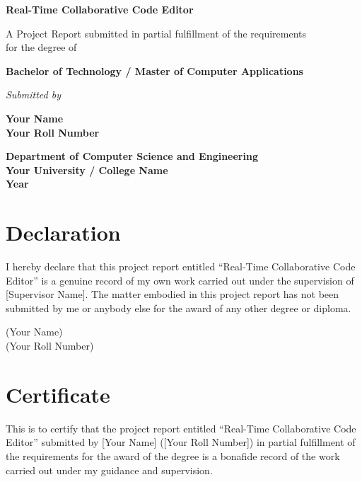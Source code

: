 \documentclass[12pt,a4paper]{report}
\begin{document}
\begin{titlepage}
    \begin{center}
        \vspace*{1cm}
        \Huge
        \textbf{Real-Time Collaborative Code Editor}
        
        \vspace{1.5cm}
        \Large
        A Project Report submitted in partial fulfillment of the requirements\\
        for the degree of
        
        \vspace{1.5cm}
        \textbf{Bachelor of Technology / Master of Computer Applications}
        
        \vspace{1.5cm}
        \textit{Submitted by}
        
        \vspace{0.5cm}
        \textbf{Your Name} \\
        \textbf{Your Roll Number}
        
        \vfill
        
        \Large
        \textbf{Department of Computer Science and Engineering}\\
        \textbf{Your University / College Name}\\
        \textbf{Year}
    \end{center}
\end{titlepage}


\chapter*{Declaration}
I hereby declare that this project report entitled ``Real-Time Collaborative Code Editor'' is a genuine record of my own work carried out under the supervision of [Supervisor Name]. The matter embodied in this project report has not been submitted by me or anybody else for the award of any other degree or diploma.

\vspace{2cm}
\begin{flushright}
(Your Name)\\
(Your Roll Number)
\end{flushright}

\chapter*{Certificate}
This is to certify that the project report entitled ``Real-Time Collaborative Code Editor'' submitted by [Your Name] ([Your Roll Number]) in partial fulfillment of the requirements for the award of the degree is a bonafide record of the work carried out under my guidance and supervision.
\end{document}
